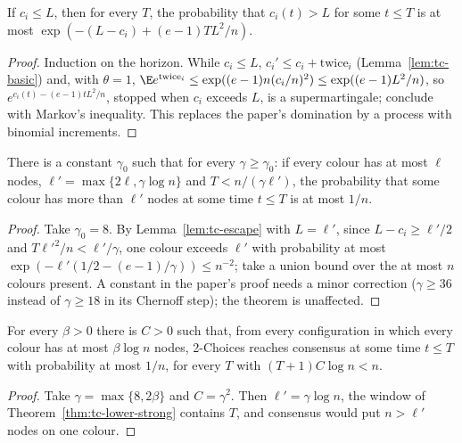 \begin{lemma}\label{lem:tc-escape}
\leanok{}
If $c_i\le L$, then for every $T$, the probability that $c_i(t)>L$ for some $t\le T$ is at most
$\exp(-(L-c_i)+(e-1)TL^2/n)$.
\end{lemma}
\begin{proof}\leanok
Induction on the horizon. While $c_i\le L$, $c_i'\le c_i+\mathrm{twice}_i$ (Lemma~\ref{lem:tc-basic})
and, with $\theta=1$, $\E e^{\mathrm{twice}_i}\le\exp((e-1)n(c_i/n)^2)\le\exp((e-1)L^2/n)$, so
$e^{c_i(t)-(e-1)tL^2/n}$, stopped when $c_i$ exceeds $L$, is a supermartingale; conclude with
Markov's inequality. This replaces the paper's domination by a process with binomial increments.
\end{proof}

\begin{theorem}[Theorem~5]\label{thm:tc-lower-strong}
\leanok{}
There is a constant $\gamma_0$ such that for every $\gamma\ge\gamma_0$: if every colour has at most
$\ell$ nodes, $\ell'=\max\{2\ell,\gamma\log n\}$ and $T<n/(\gamma\ell')$, the probability that some
colour has more than $\ell'$ nodes at some time $t\le T$ is at most $1/n$.
\end{theorem}
\begin{proof}\leanok
Take $\gamma_0=8$. By Lemma~\ref{lem:tc-escape} with $L=\ell'$, since $L-c_i\ge\ell'/2$ and
$T\ell'^2/n<\ell'/\gamma$, one colour exceeds $\ell'$ with probability at most
$\exp(-\ell'(1/2-(e-1)/\gamma))\le n^{-2}$; take a union bound over the at most $n$ colours
present. A constant in the paper's proof needs a minor correction ($\gamma\ge36$ instead of
$\gamma\ge18$ in its Chernoff step); the theorem is unaffected.
\end{proof}

\begin{theorem}\label{thm:tc-lower}
\leanok{}
For every $\beta>0$ there is $C>0$ such that, from every configuration in which every colour has at
most $\beta\log n$ nodes, 2-Choices reaches consensus at some time $t\le T$ with probability at
most $1/n$, for every $T$ with $(T+1)C\log n<n$.
\end{theorem}
\begin{proof}\leanok
Take $\gamma=\max\{8,2\beta\}$ and $C=\gamma^2$. Then $\ell'=\gamma\log n$, the window of
Theorem~\ref{thm:tc-lower-strong} contains $T$, and consensus would put $n>\ell'$ nodes on one
colour.
\end{proof}


